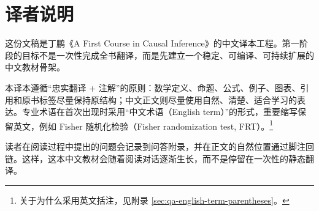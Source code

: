 \chapter*{译者说明}

这份文稿是丁鹏《A First Course in Causal Inference》的中文译本工程。第一阶段的目标不是一次性完成全书翻译，而是先建立一个稳定、可编译、可持续扩展的中文教材骨架。

本译本遵循“忠实翻译 + 注解”的原则：数学定义、命题、公式、例子、图表、引用和原书标签尽量保持原结构；中文正文则尽量使用自然、清楚、适合学习的表达。专业术语在首次出现时采用“中文术语（English term）”的形式，重要缩写保留英文，例如 Fisher 随机化检验（Fisher randomization test, FRT）。\footnote{关于为什么采用英文括注，见附录 \cref{sec:qa-english-term-parentheses}。}

读者在阅读过程中提出的问题会记录到问答附录，并在正文的自然位置通过脚注回链。这样，这本中文教材会随着阅读对话逐渐生长，而不是停留在一次性的静态翻译。
